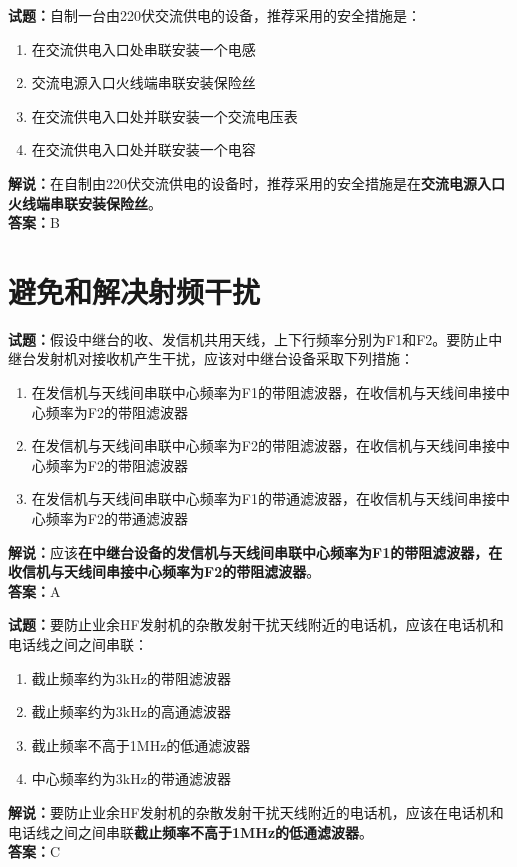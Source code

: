 \documentclass{ctexbook}
\begin{document}
\noindent\textbf{试题：}自制一台由220伏交流供电的设备，推荐采用的安全措施是：
\begin{enumerate}[leftmargin=3em]
  \item 在交流供电入口处串联安装一个电感
  \item 交流电源入口火线端串联安装保险丝
  \item 在交流供电入口处并联安装一个交流电压表
  \item 在交流供电入口处并联安装一个电容
\end{enumerate}
\noindent\textbf{解说：}在自制由220伏交流供电的设备时，推荐采用的安全措施是在\textbf{交流电源入口火线端串联安装保险丝}。\\\noindent\textbf{答案：}B



\chapter{避免和解决射频干扰}

\newpage

\noindent\textbf{试题：}假设中继台的收、发信机共用天线，上下行频率分别为F1和F2。要防止中继台发射机对接收机产生干扰，应该对中继台设备采取下列措施：
\begin{enumerate}[leftmargin=3em]
  \item 在发信机与天线间串联中心频率为F1的带阻滤波器，在收信机与天线间串接中心频率为F2的带阻滤波器
  \item 在发信机与天线间串联中心频率为F2的带阻滤波器，在收信机与天线间串接中心频率为F2的带阻滤波器
  \item 在发信机与天线间串联中心频率为F1的带通滤波器，在收信机与天线间串接中心频率为F2的带通滤波器
\end{enumerate}
\noindent\textbf{解说：}应该\textbf{在中继台设备的发信机与天线间串联中心频率为F1的带阻滤波器，在收信机与天线间串接中心频率为F2的带阻滤波器}。\\\noindent\textbf{答案：}A

\vspace{\baselineskip}

\noindent\textbf{试题：}要防止业余HF发射机的杂散发射干扰天线附近的电话机，应该在电话机和电话线之间之间串联：
\begin{enumerate}[leftmargin=3em]
  \item 截止频率约为3\si{\kHz}的带阻滤波器
  \item 截止频率约为3\si{\kHz}的高通滤波器
  \item 截止频率不高于1\si{\MHz}的低通滤波器
  \item 中心频率约为3\si{\kHz}的带通滤波器
\end{enumerate}
\noindent\textbf{解说：}要防止业余HF发射机的杂散发射干扰天线附近的电话机，应该在电话机和电话线之间之间串联\textbf{截止频率不高于1\si{\MHz}的低通滤波器}。\\\noindent
\textbf{答案：}C
\end{document}
